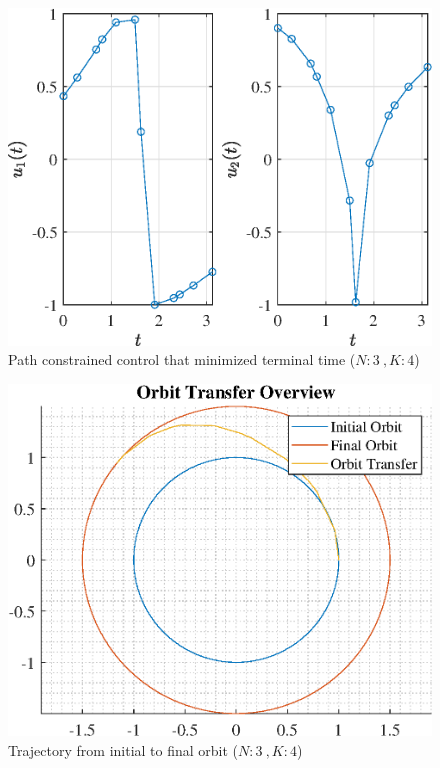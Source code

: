 \documentclass[]{article}
\begin{document}
\begin{figure}
	\centering
	\includegraphics[scale=0.75]{path_N3_K4_C3_tf.eps}
	\caption{Path constrained control that minimized terminal time (\(N:3\ , K:4\))}
	\label{fig:path_N3_K4_C3_tf}
\end{figure}
\begin{figure}
	\centering
	\includegraphics[scale=0.75]{orbit_N3_K4_C3_tf.eps}
	\caption{Trajectory from initial to final orbit (\(N:3\ , K:4\))}
	\label{fig:orbit_N3_K4_C3_tf}
\end{figure}
\end{document}
